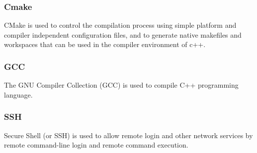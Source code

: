 \documentclass[10pt]{article}
\begin{document}
\subsubsection{Cmake}
CMake is used to control the compilation process using simple platform and compiler independent configuration files, and to generate native makefiles and workspaces that can be used in the compiler environment of c++.

\subsubsection{GCC}
The GNU Compiler Collection (GCC) is used to compile C++ programming language.

\subsubsection{SSH}
Secure Shell (or SSH) is used to allow remote login and other network services by remote command-line login and remote command execution.




\end{document}

